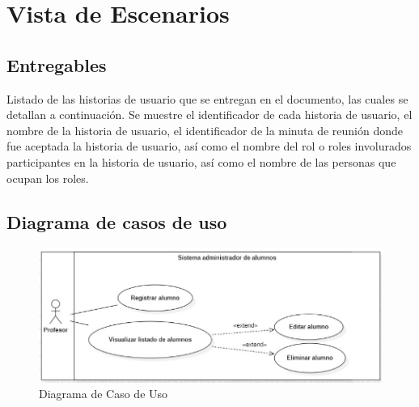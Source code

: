 \chapter{Vista de Escenarios}

	\section{Entregables}

Listado de las historias de usuario que se entregan en el documento, las cuales se detallan a continuación. Se muestre el identificador de cada historia de usuario, el nombre de la historia de usuario, el identificador de la minuta de reunión donde fue aceptada la historia de usuario, así como el nombre del rol o roles involurados participantes en la historia de usuario, así como el nombre de las personas que ocupan los roles.

	\section{Diagrama de casos de uso}
	\begin{figure}[h]
			\centering
			\includegraphics[scale=0.5]{./arquitectura/imagenes/CU1.png}
			\caption{Diagrama de Caso de Uso}
	\end{figure}
